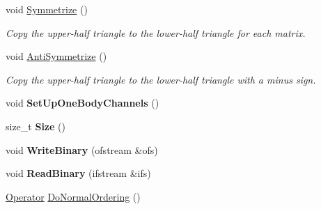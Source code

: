 \begin{DoxyCompactItemize}
\item 
void \hyperlink{classOperator_a98d4075d734523186162492a4a45b420}{Symmetrize} ()\hypertarget{classOperator_a98d4075d734523186162492a4a45b420}{}\label{classOperator_a98d4075d734523186162492a4a45b420}

\begin{DoxyCompactList}\small\item\em Copy the upper-\/half triangle to the lower-\/half triangle for each matrix. \end{DoxyCompactList}\item 
void \hyperlink{classOperator_a21a37daa051c248109153e6502b8280f}{Anti\+Symmetrize} ()\hypertarget{classOperator_a21a37daa051c248109153e6502b8280f}{}\label{classOperator_a21a37daa051c248109153e6502b8280f}

\begin{DoxyCompactList}\small\item\em Copy the upper-\/half triangle to the lower-\/half triangle with a minus sign. \end{DoxyCompactList}\item 
void {\bfseries Set\+Up\+One\+Body\+Channels} ()\hypertarget{classOperator_ad6168f16f6c0b2cf70a1fc0676e70523}{}\label{classOperator_ad6168f16f6c0b2cf70a1fc0676e70523}

\item 
size\+\_\+t {\bfseries Size} ()\hypertarget{classOperator_a953ce26eec380dd538bd288009f4643e}{}\label{classOperator_a953ce26eec380dd538bd288009f4643e}

\item 
void {\bfseries Write\+Binary} (ofstream \&ofs)\hypertarget{classOperator_a422206b98c49d82f9edc21c8e69b4613}{}\label{classOperator_a422206b98c49d82f9edc21c8e69b4613}

\item 
void {\bfseries Read\+Binary} (ifstream \&ifs)\hypertarget{classOperator_a40fdb2790aba35e093725ff897b0e0cc}{}\label{classOperator_a40fdb2790aba35e093725ff897b0e0cc}

\item 
\hyperlink{classOperator}{Operator} \hyperlink{classOperator_a622880b91a902c832b867c6447a262e7}{Do\+Normal\+Ordering} ()\hypertarget{classOperator_a622880b91a902c832b867c6447a262e7}{}\label{classOperator_a622880b91a902c832b867c6447a262e7}


\end{DoxyCompactItemize}

